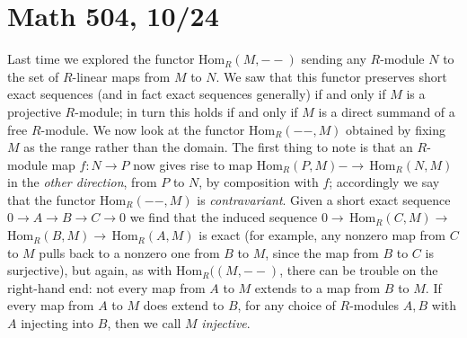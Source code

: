 \documentclass[10pt]{article}
\begin{document}
\section*{Math 504, 10/24}

Last time we explored the functor Hom$_R(M,--)$ sending any $R$-module
$N$ to the set of $R$-linear maps from $M$ to $N$. We saw that this
functor preserves short exact sequences (and in fact exact sequences
generally) if and only if $M$ is a projective $R$-module; in turn this
holds if and only if $M$ is a direct summand of a free $R$-module. We
now look at the functor Hom$_R(--,M)$ obtained by fixing $M$ as the
range rather than the domain. The first thing to note is that an
$R$-module map $f:N\rightarrow P$ now gives rise to map
Hom$_R(P,M)-\rightarrow\,$Hom$_R(N,M)$ in the {\sl other direction},
from $P$ to $N$, by composition with $f$; accordingly we say that the
functor Hom$_R(--,M)$ is {\sl contravariant}. Given a short exact
sequence $0\rightarrow A\rightarrow B\rightarrow C\rightarrow 0$ we find
that the induced sequence
$0\rightarrow\,$Hom$_R(C,M)\rightarrow\,$Hom$_R(B,M)\rightarrow\,$Hom$_R(A,M)$
is exact (for example, any nonzero map from $C$ to $M$ pulls back to a
nonzero one from $B$ to $M$, since the map from $B$ to $C$ is
surjective), but again, as with Hom$_R((M,--)$, there can be trouble on
the right-hand end: not every map from $A$ to $M$ extends to a map from
$B$ to $M$. If every map from $A$ to $M$ does extend to $B$, for any
choice of $R$-modules $A,B$ with $A$ injecting into $B$, then we call
$M$ {\sl injective}.
\end{document}
